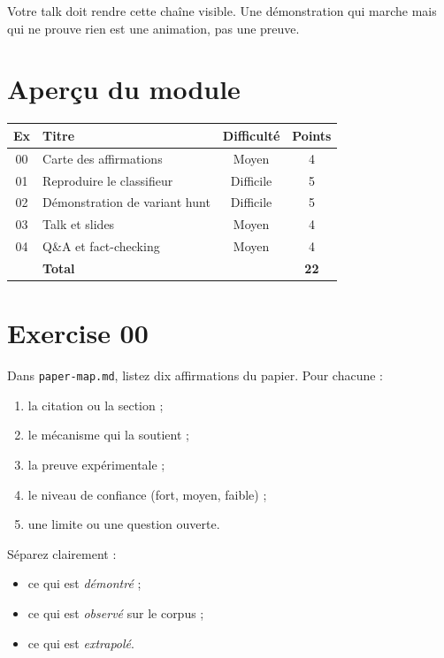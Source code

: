 \documentclass{training}
\begin{document}
Votre talk doit rendre cette chaîne visible. Une démonstration qui marche
mais qui ne prouve rien est une animation, pas une preuve.

\chapter{Aperçu du module}

\begin{center}
\begin{tabularx}{\linewidth}{|c|l|c|c|}
\hline
\textbf{Ex} & \textbf{Titre} & \textbf{Difficulté} & \textbf{Points} \\ \hline
00 & Carte des affirmations & Moyen & 4 \\
01 & Reproduire le classifieur & Difficile & 5 \\
02 & Démonstration de variant hunt & Difficile & 5 \\
03 & Talk et slides & Moyen & 4 \\
04 & Q\&A et fact-checking & Moyen & 4 \\ \hline
& \textbf{Total} & & \textbf{22} \\ \hline
\end{tabularx}
\end{center}

\startexercices

\chapter{Exercise 00}
\makeheaderfiles

Dans \texttt{paper-map.md}, listez dix affirmations du papier. Pour chacune :

\begin{enumerate}
  \item la citation ou la section ;
  \item le mécanisme qui la soutient ;
  \item la preuve expérimentale ;
  \item le niveau de confiance (fort, moyen, faible) ;
  \item une limite ou une question ouverte.
\end{enumerate}

Séparez clairement :

\begin{itemize}
  \item ce qui est \emph{démontré} ;
  \item ce qui est \emph{observé} sur le corpus ;
  \item ce qui est \emph{extrapolé}.
\end{itemize}
\end{document}

